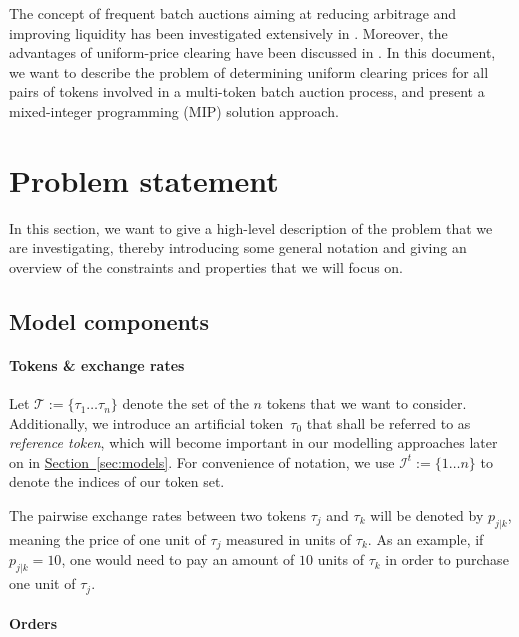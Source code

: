\documentclass[11pt,parskip=full]{scrartcl}%
\newcommand*{\tokens}{\mathcal{T}}          %
\newcommand*{\secref}[1]{\hyperref[{#1}]{Section~\ref*{#1}}}
\begin{document}
The concept of frequent batch auctions aiming at reducing arbitrage and improving liquidity has
been investigated extensively in \cite{BUDISH-ET-AL_2015:HFT}.
Moreover, the advantages of uniform-price clearing have been discussed in 
\cite{ENGELBRECHT-KAHN_1998:multi-unit-auctions}.
In this document, we want to describe the problem of determining uniform clearing prices for all
pairs of tokens involved in a multi-token batch auction process, and present a mixed-integer
programming (MIP) solution approach.


\clearpage
\section{Problem statement}
\label{sec:problem}

In this section, we want to give a high-level description of the problem that we are investigating,
thereby introducing some general notation and giving an overview of the constraints and properties
that we will focus on.

\subsection{Model components}
\label{subsec:model_components}

\paragraph{Tokens \& exchange rates}

Let $ \tokens := \{ \tau_1 \ldots \tau_n \} $ denote the set of the $ n $ tokens that we want to
consider.
Additionally, we introduce an artificial token~$ \tau_0 $ that shall be referred to as 
\emph{reference token}, which will become important in our modelling approaches later on in 
\secref{sec:models}.
For convenience of notation, we use $ \mathcal{I}^t := \{ 1 \ldots n \} $ to denote the indices
of our token set.

The pairwise exchange rates between two tokens $ \tau_j $ and $ \tau_k $ will be denoted by
$ p_{j|k} $, meaning the price of one unit of $ \tau_j $ measured in units of $ \tau_k $.
As an example, if $ p_{j|k} = 10 $, one would need to pay an amount of $ 10 $ units of $ \tau_k $
in order to purchase one unit of $ \tau_j $.

\paragraph{Orders}
\end{document}
